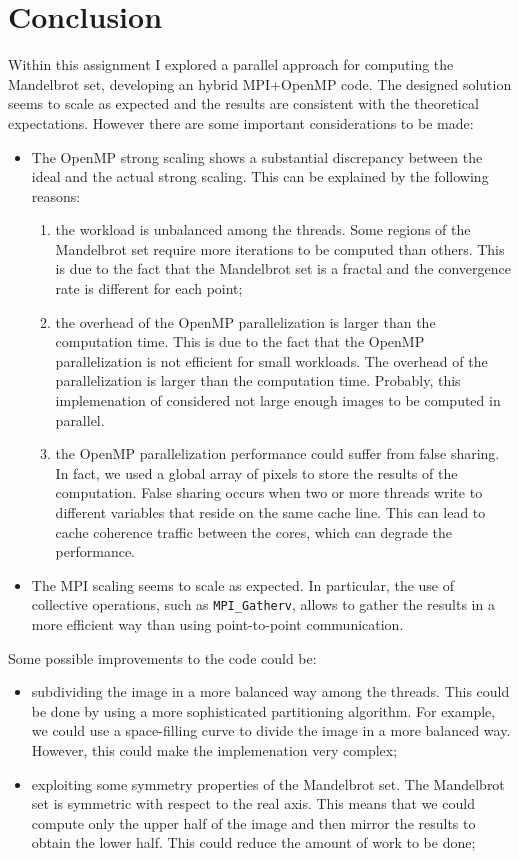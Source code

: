 \section{Conclusion}

Within this assignment I explored a parallel approach for computing the Mandelbrot set, developing an hybrid MPI+OpenMP code.
The designed solution seems to scale as expected and the results are consistent with the theoretical expectations.
However there are some important considerations to be made:
\begin{itemize}
    \item The OpenMP strong scaling shows a substantial discrepancy between the ideal and the actual strong scaling. This can be explained by the following reasons:
    \begin{enumerate}
        \item the workload is unbalanced among the threads. Some regions of the Mandelbrot set require more iterations to be computed than others. This is due to the fact that the Mandelbrot set is a fractal and the convergence rate is different for each point;
        \item the overhead of the OpenMP parallelization is larger than the computation time. This is due to the fact that the OpenMP parallelization is not efficient for small workloads. The overhead of the parallelization is larger than the computation time. Probably, this implemenation of considered not large enough images to be computed in parallel.
        \item the OpenMP parallelization performance could suffer from false sharing. In fact, we used a global array of pixels to store the results of the computation. False sharing occurs when two or more threads write to different variables that reside on the same cache line. This can lead to cache coherence traffic between the cores, which can degrade the performance. 
    \end{enumerate}
    \item The MPI scaling seems to scale as expected. In particular, the use of collective operations, such as \texttt{MPI\_Gatherv}, allows to gather the results in a more efficient way than using point-to-point communication.
\end{itemize}

Some possible improvements to the code could be:
\begin{itemize}
    \item subdividing the image in a more balanced way among the threads. This could be done by using a more sophisticated partitioning algorithm. For example, we could use a space-filling curve to divide the image in a more balanced way. However, this could make the implemenation very complex;
    \item exploiting some symmetry properties of the Mandelbrot set. The Mandelbrot set is symmetric with respect to the real axis. This means that we could compute only the upper half of the image and then mirror the results to obtain the lower half. This could reduce the amount of work to be done;
\end{itemize}
    
